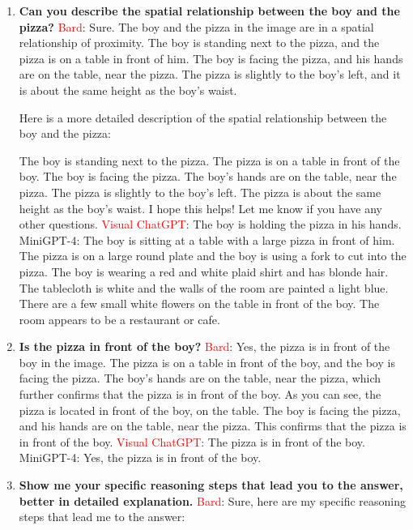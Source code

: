     \begin{enumerate}
        \item \textbf{Can you describe the spatial relationship between the boy and the pizza?}
        \subitem 
        \textcolor{Red}{Bard}:
        Sure. The boy and the pizza in the image are in a spatial relationship of proximity. The boy is standing next to the pizza, and the pizza is on a table in front of him. The boy is facing the pizza, and his hands are on the table, near the pizza. The pizza is slightly to the boy's left, and it is about the same height as the boy's waist.

        Here is a more detailed description of the spatial relationship between the boy and the pizza:

        The boy is standing next to the pizza.
        The pizza is on a table in front of the boy.
        The boy is facing the pizza.
        The boy's hands are on the table, near the pizza.
        The pizza is slightly to the boy's left.
        The pizza is about the same height as the boy's waist.
        I hope this helps! Let me know if you have any other questions.
        \subitem \textcolor{red}{Visual ChatGPT}: The boy is holding the pizza in his hands.
        \subitem MiniGPT-4: The boy is sitting at a table with a large pizza in front of him. The pizza is on a large round plate and the boy is using a fork to cut into the pizza. The boy is wearing a red and white plaid shirt and has blonde hair. The tablecloth is white and the walls of the room are painted a light blue. There are a few small white flowers on the table in front of the boy. The room appears to be a restaurant or cafe.
        \item \textbf{Is the pizza in front of the boy?}
        \subitem \textcolor{Red}{Bard}: Yes, the pizza is in front of the boy in the image. The pizza is on a table in front of the boy, and the boy is facing the pizza. The boy's hands are on the table, near the pizza, which further confirms that the pizza is in front of the boy.
        As you can see, the pizza is located in front of the boy, on the table. The boy is facing the pizza, and his hands are on the table, near the pizza. This confirms that the pizza is in front of the boy.
        \subitem \textcolor{red}{Visual ChatGPT}: The pizza is in front of the boy.
        \subitem MiniGPT-4: Yes, the pizza is in front of the boy.
        \item \textbf{Show me your specific reasoning steps that lead you to the answer, better in detailed explanation.}
        \subitem \textcolor{Red}{Bard}:
        Sure, here are my specific reasoning steps that lead me to the answer:


\end{enumerate}
